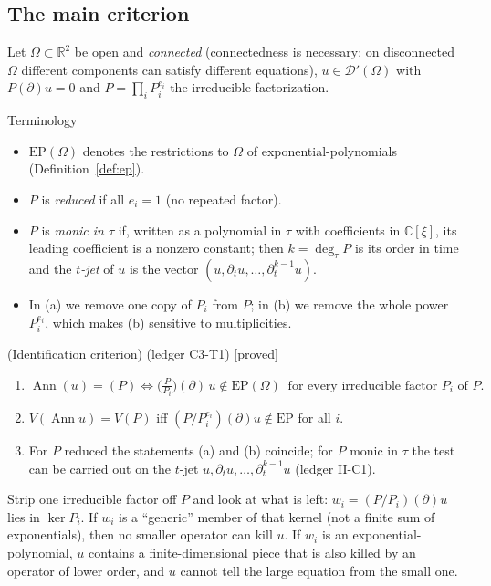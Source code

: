 \documentclass[11pt,a4paper]{article}
\theoremstyle{definition}
\newcommand{\badge}[2]{\textcolor{#1}{\textsf{\footnotesize[#2]}}}
\newcommand{\proved}[1][]{\badge{cC}{proved#1}}
\newcommand{\led}[1]{\textcolor{cG}{\textsf{\footnotesize(ledger #1)}}}
\newcommand{\R}{\mathbb{R}}\newcommand{\C}{\mathbb{C}}\newcommand{\N}{\mathbb{N}}\newcommand{\Z}{\mathbb{Z}}
\newcommand{\Ann}{\operatorname{Ann}}
\newcommand{\EP}{\mathrm{EP}}
\newcommand{\Var}{V}
\begin{document}
\subsection{The main criterion}
Let $\Omega\subset\R^2$ be open and \emph{connected} (connectedness is necessary: on disconnected $\Omega$ different components can satisfy different equations), $u\in\mathcal D'(\Omega)$ with $P(\partial)u=0$ and $P=\prod_iP_i^{e_i}$ the irreducible factorization.

\begin{notebox}{Terminology}
\begin{itemize}[nosep]
\item $\EP(\Omega)$ denotes the restrictions to $\Omega$ of exponential-polynomials (Definition~\ref{def:ep}).
\item $P$ is \emph{reduced} if all $e_i=1$ (no repeated factor).
\item $P$ is \emph{monic in $\tau$} if, written as a polynomial in $\tau$ with coefficients in $\C[\xi]$, its leading coefficient is a nonzero constant; then $k=\deg_\tau P$ is its order in time and the \emph{$t$-jet} of $u$ is the vector $(u,\partial_tu,\dots,\partial_t^{k-1}u)$.
\item In (a) we remove one copy of $P_i$ from $P$; in (b) we remove the whole power $P_i^{e_i}$, which makes (b) sensitive to multiplicities.
\end{itemize}
\end{notebox}
\begin{theorem}{(Identification criterion) \led{C3-T1} \proved[]}\label{thm:ident}
\begin{enumerate}[label=(\alph*),leftmargin=*,nosep]
\item $\displaystyle\Ann(u)=(P)\iff\Big(\frac{P}{P_i}\Big)(\partial)\,u\notin\EP(\Omega)\ \text{ for every irreducible factor }P_i\text{ of }P.$
\item $\Var(\Ann u)=\Var(P)$ iff $(P/P_i^{e_i})(\partial)u\notin\EP$ for all $i$.
\item For $P$ reduced the statements (a) and (b) coincide; for $P$ monic in $\tau$ the test can be carried out on the $t$-jet $u,\partial_tu,\dots,\partial_t^{k-1}u$ \led{II-C1}.
\end{enumerate}
\end{theorem}
\begin{intuition}
Strip one irreducible factor off $P$ and look at what is left: $w_i=(P/P_i)(\partial)u$ lies in $\ker P_i$. If $w_i$ is a ``generic'' member of that kernel (not a finite sum of exponentials), then no smaller operator can kill $u$. If $w_i$ is an exponential-polynomial, $u$ contains a finite-dimensional piece that is also killed by an operator of lower order, and $u$ cannot tell the large equation from the small one.
\end{intuition}
\end{document}
